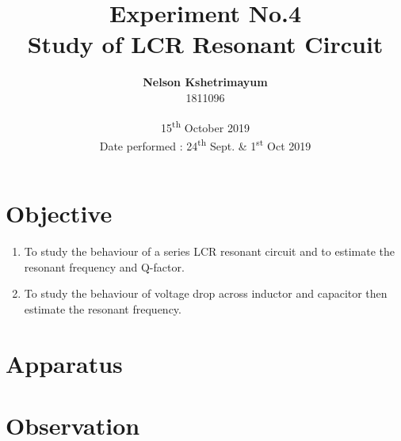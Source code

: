 \documentclass[a4paper]{article}
\title {Experiment No.4 \\ \Large \textbf{Study of LCR Resonant Circuit}}
\author{\textbf {Nelson Kshetrimayum} \\ 1811096}
\date{15\textsuperscript{th} October 2019 \\ Date performed : 24\textsuperscript{th} Sept. \& 1\textsuperscript{st} Oct 2019}
\begin{document}
\twocolumn
\maketitle



\section{Objective}
\begin{enumerate}
\item To study the behaviour of a series LCR resonant circuit and to estimate the resonant frequency and Q-factor.
\item To study the behaviour of voltage drop across inductor and capacitor then estimate the resonant frequency.
\end{enumerate}

\section{Apparatus}

\section{Observation}
\end{document}
